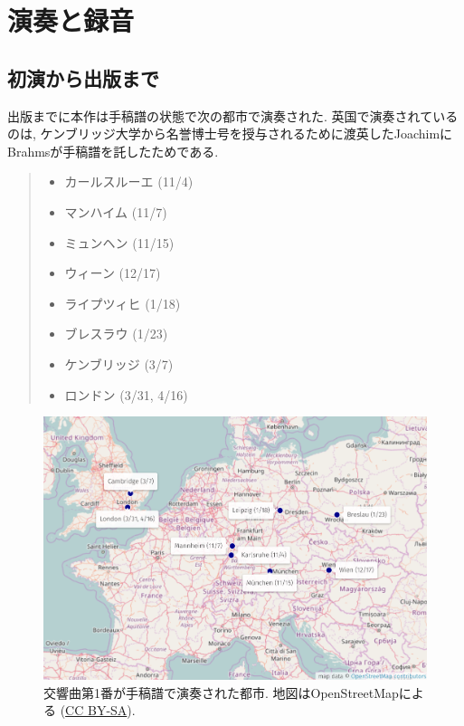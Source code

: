 
\chapter{演奏と録音}

\section{初演から出版まで}\label{sec: till publication}

出版までに本作は手稿譜の状態で次の都市で演奏された. 英国で演奏されているのは,
ケンブリッジ大学から名誉博士号を授与されるために渡英したJoachimにBrahmsが手稿譜を託したためである\cite{kaisouroku}. 
\begin{quote}
\begin{multicols}{2}
	\begin{itemize}
		\item カールスルーエ (11/4)
		\item マンハイム (11/7)
		\item ミュンヘン (11/15)
		\item ウィーン (12/17)
		\item ライプツィヒ (1/18)
		\item ブレスラウ (1/23)
		\item ケンブリッジ (3/7)
		\item ロンドン (3/31, 4/16)
	\end{itemize}
\end{multicols}
\end{quote}

\begin{figure}[htbp]
	\begin{center}
    \includegraphics[clip,width=14.0cm]{./figure/map-concert.png}
	\caption{交響曲第1番が手稿譜で演奏された都市.
		地図はOpenStreetMapによる (\href{http://www.openstreetmap.org/copyright}{CC BY-SA}).}
    \label{fig: concert}
	\end{center}
\end{figure}

